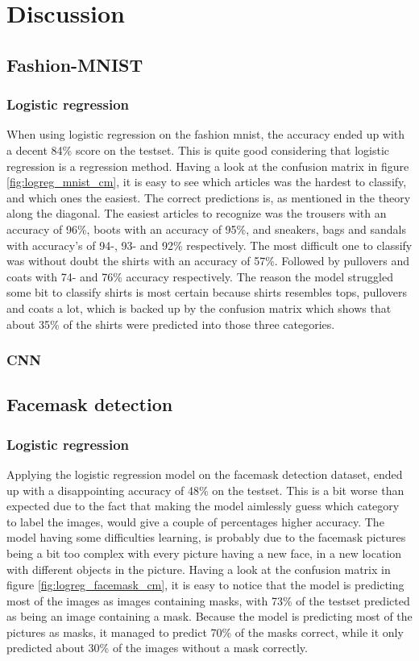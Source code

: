 \documentclass[../main.tex]{subfiles}
\begin{document}
\section{Discussion}

\subsection{Fashion-MNIST}
\subsubsection{Logistic regression}
When using logistic regression on the fashion mnist, the accuracy ended up with a decent 84\% score on the testset. This is quite good considering that logistic regression is a regression method. Having a look at the confusion matrix in figure \ref{fig:logreg_mnist_cm}, it is easy to see which articles was the hardest to classify, and which ones the easiest. The correct predictions is, as mentioned in the theory along the diagonal. The easiest articles to recognize was the trousers with an accuracy of 96\%, boots with an accuracy of 95\%, and sneakers, bags and sandals with accuracy's of 94-, 93- and 92\% respectively. The most difficult one to classify was without doubt the shirts with an accuracy of 57\%. Followed by pullovers and coats with 74- and 76\% accuracy respectively. The reason the model struggled some bit to classify shirts is most certain because shirts resembles tops, pullovers and coats a lot, which is backed up by the confusion matrix which shows that about 35\% of the shirts were predicted into those three categories.

\subsubsection{CNN}

\subsection{Facemask detection}
\subsubsection{Logistic regression}
Applying the logistic regression model on the facemask detection dataset, ended up with a disappointing accuracy of 48\% on the testset. This is a bit worse than expected due to the fact that making the model aimlessly guess which category to label the images, would give a couple of percentages higher accuracy. The model having some difficulties learning, is probably due to the facemask pictures being a bit too complex with every picture having a new face, in a new location with different objects in the picture. Having a look at the confusion matrix in figure \ref{fig:logreg_facemask_cm}, it is easy to notice that the model is predicting most of the images as images containing masks, with 73\% of the testset predicted as being an image containing a mask. Because the model is predicting most of the pictures as masks, it managed to predict 70\% of the masks correct, while it only predicted about 30\% of the images without a mask correctly.
\end{document}
